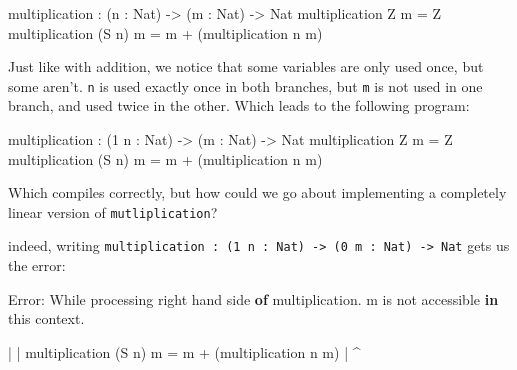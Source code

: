 \documentclass[
]{article}
\newenvironment{Shaded}{}{}
\newcommand{\DataTypeTok}[1]{\textcolor[rgb]{0.56,0.13,0.00}{#1}}
\newcommand{\DecValTok}[1]{\textcolor[rgb]{0.25,0.63,0.44}{#1}}
\newcommand{\FunctionTok}[1]{\textcolor[rgb]{0.02,0.16,0.49}{#1}}
\newcommand{\KeywordTok}[1]{\textcolor[rgb]{0.00,0.44,0.13}{\textbf{#1}}}
\newcommand{\NormalTok}[1]{#1}
\newcommand{\OperatorTok}[1]{\textcolor[rgb]{0.40,0.40,0.40}{#1}}
\newcommand{\OtherTok}[1]{\textcolor[rgb]{0.00,0.44,0.13}{#1}}
\begin{document}
\begin{Shaded}
\begin{Highlighting}[]
\NormalTok{multiplication }\OperatorTok{:}\NormalTok{ (n }\OperatorTok{:} \DataTypeTok{Nat}\NormalTok{) }\OtherTok{{-}\textgreater{}}\NormalTok{ (m }\OperatorTok{:} \DataTypeTok{Nat}\NormalTok{) }\OtherTok{{-}\textgreater{}} \DataTypeTok{Nat}
\NormalTok{multiplication }\DataTypeTok{Z}\NormalTok{ m }\OtherTok{=} \DataTypeTok{Z} 
\NormalTok{multiplication (}\DataTypeTok{S}\NormalTok{ n) m }\OtherTok{=}\NormalTok{ m }\OperatorTok{+}\NormalTok{ (multiplication n m)}
\end{Highlighting}
\end{Shaded}

Just like with addition, we notice that some variables are only used
once, but some aren't. \texttt{n} is used exactly once in both branches,
but \texttt{m} is not used in one branch, and used twice in the other.
Which leads to the following program:

\begin{Shaded}
\begin{Highlighting}[]
\NormalTok{ multiplication }\OperatorTok{:}\NormalTok{ (}\DecValTok{1}\NormalTok{ n }\OperatorTok{:} \DataTypeTok{Nat}\NormalTok{) }\OtherTok{{-}\textgreater{}}\NormalTok{ (m }\OperatorTok{:} \DataTypeTok{Nat}\NormalTok{) }\OtherTok{{-}\textgreater{}} \DataTypeTok{Nat}
\NormalTok{ multiplication }\DataTypeTok{Z}\NormalTok{ m }\OtherTok{=} \DataTypeTok{Z}
\NormalTok{ multiplication (}\DataTypeTok{S}\NormalTok{ n) m }\OtherTok{=}\NormalTok{ m }\OperatorTok{+}\NormalTok{ (multiplication n m)}
\end{Highlighting}
\end{Shaded}

Which compiles correctly, but how could we go about implementing a
completely linear version of \texttt{mutliplication}?

indeed, writing
\texttt{multiplication\ :\ (1\ n\ :\ Nat)\ -\textgreater{}\ (0\ m\ :\ Nat)\ -\textgreater{}\ Nat}
gets us the error:

\begin{Shaded}
\begin{Highlighting}[]
\DataTypeTok{Error}\OperatorTok{:} \DataTypeTok{While}\NormalTok{ processing right hand side }\KeywordTok{of}\NormalTok{ multiplication}\OperatorTok{.}\NormalTok{ m is }\FunctionTok{not}\NormalTok{ accessible }\KeywordTok{in}\NormalTok{ this context}\OperatorTok{.}

    \OperatorTok{|}
    \OperatorTok{|}\NormalTok{ multiplication (}\DataTypeTok{S}\NormalTok{ n) m }\OtherTok{=}\NormalTok{ m }\OperatorTok{+}\NormalTok{ (multiplication n m)}
    \OperatorTok{|}                          \OperatorTok{\^{}}
\end{Highlighting}
\end{Shaded}
\end{document}
